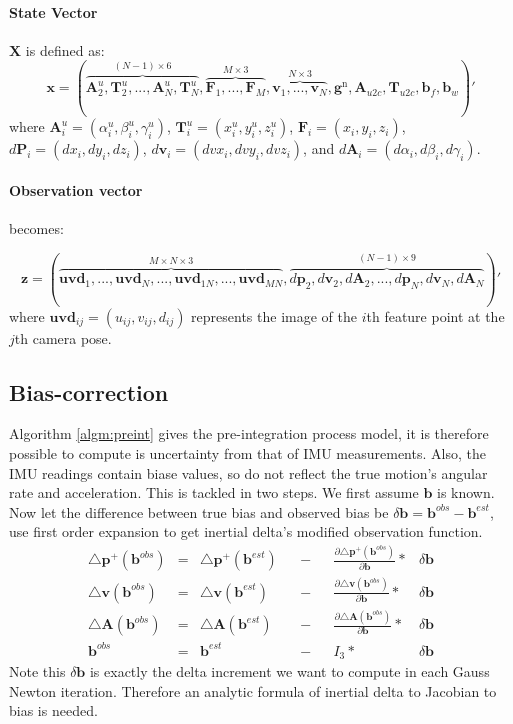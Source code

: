 \documentclass[12pt]{article}   %
\begin{document}
\paragraph{State Vector} $\textbf{X}$ is defined as:
$$\textbf{x} = (\overbrace{\textbf{A}^u_2, \textbf{T}^u_{2}, ... , \textbf{A}^u_{N}, \textbf{T}^u_{N}}^{(N - 1) \times 6}, \overbrace{\textbf{F}_{1}, ..., \textbf{F}_{M}}^{M \times 3}, \overbrace{\textbf{v}_1, ..., \textbf{v}_{N}}^{N \times 3},  \textbf{g}^{\mathrm{n}}, \textbf{A}_{u2c}, \textbf{T}_{u2c}, \textbf{b}_f, \textbf{b}_w)' $$
where
$\textbf{A}^u_i = (\alpha^u_i, \beta^u_i, \gamma^u_i)$,
$\textbf{T}^u_i = (x^u_i, y^u_i, z^u_i) $,
$\textbf{F}_{i} = (x_{i}, y_{i}, z_{i}) $,
$d\textbf{P}_{i} = (dx_{i}, dy_{i}, dz_{i}) $,
$d\textbf{v}_{i} = (dvx_{i}, dvy_{i}, dvz_{i}) $, and
$d\textbf{A}_{i} = (d\alpha_{i}, d\beta_{i}, d\gamma_{i}) $.

\paragraph{Observation vector} becomes:

$$\textbf{z} = (\overbrace{\textbf{uvd}_{1}, ... , \textbf{uvd}_{N}, ..., \textbf{uvd}_{1N}, ... , \textbf{uvd}_{MN}}^{M \times N \times 3}, \overbrace{d\textbf{p}_2, d\textbf{v}_2, d\textbf{A}_2, ..., d\textbf{p}_N, d\textbf{v}_N, d\textbf{A}_N}^{(N - 1) \times 9})' $$
where $\textbf{uvd}_{ij} = (u_{ij}, v_{ij}, d_{ij})$ represents the image of the $i$th feature point  at the $j$th camera pose.

\subsection{Bias-correction}
Algorithm \ref{algm:preint} gives the pre-integration process model, it is therefore possible to compute is uncertainty from that of IMU measurements. Also, the IMU readings contain biase values, so do not reflect the true motion's angular rate and acceleration. This is tackled in two steps. We first assume $\bm{b}$ is known. Now let the difference between true bias and observed bias be $\delta \bm{b} = \bm{b}^{obs} - \bm{b}^{est}$, use first order expansion to get inertial delta's modified observation function.
\begin{align}
\triangle \bm{p}^+(\bm{b}^{obs}) &=& \triangle \bm{p}^+(\bm{b}^{est})& &- & &\frac{\partial {\triangle \bm{p}^+(\bm{b}^{obs})}}{\partial \bm{b}}  *&\delta \bm{b} \\
\triangle \bm{v}(\bm{b}^{obs}) &=& \triangle \bm{v}(\bm{b}^{est})& &- & & \frac{\partial {\triangle \bm{v}(\bm{b}^{obs})}}{\partial \bm{b}}*& \delta \bm{b} \\
\triangle \bm{A}(\bm{b}^{obs}) &=& \triangle \bm{A}(\bm{b}^{est})& &- & &\frac{\partial {\triangle \bm{A}(\bm{b}^{obs})}}{\partial \bm{b}}*& \delta \bm{b} \\
\bm{b}^{obs} &=& \bm{b}^{est}& &- & & I_3*&\delta \bm{b}
\end{align}
Note this $\delta \bm{b}$ is exactly the delta increment we want to compute in each Gauss Newton iteration. Therefore an analytic formula of inertial delta to Jacobian to bias is needed.
\end{document}
